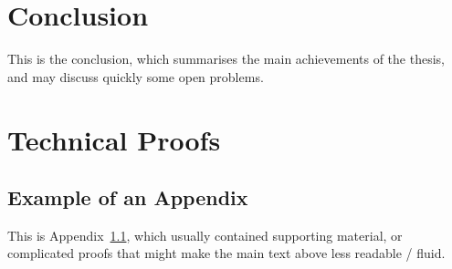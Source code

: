 \documentclass[a4paper, twoside]{report}
\theoremstyle{definition}
\numberwithin{equation}{section}
\begin{document}

\newpage
\chapter*{Conclusion}
This is the conclusion, which summarises the main achievements of the thesis,
and may discuss quickly some open problems.


\newpage
\appendix
\chapter{Technical Proofs}
\section{Example of an Appendix}\label{app:Appendix}
This is Appendix~\ref{app:Appendix}, which usually contained supporting material,
or complicated proofs that might make the main text above less readable / fluid.



\end{document}
